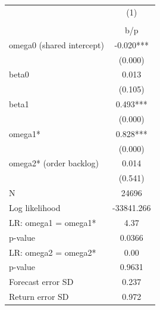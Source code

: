{
\def\sym#1{\ifmmode^{#1}\else\(^{#1}\)\fi}
\begin{tabular}{l*{1}{c}}
\hline\hline
                    &\multicolumn{1}{c}{(1)}\\
                    &\multicolumn{1}{c}{}\\
                    &         b/p   \\
\hline
omega0 (shared intercept)&      -0.020***\\
                    &     (0.000)   \\
beta0               &       0.013   \\
                    &     (0.105)   \\
beta1               &       0.493***\\
                    &     (0.000)   \\
omega1*             &       0.828***\\
                    &     (0.000)   \\
omega2* (order backlog)&       0.014   \\
                    &     (0.541)   \\
\hline
N                   &       24696   \\
Log likelihood      &  -33841.266   \\
LR: omega1 = omega1*&        4.37   \\
p-value             &      0.0366   \\
LR: omega2 = omega2*&        0.00   \\
p-value             &      0.9631   \\
Forecast error SD   &       0.237   \\
Return error SD     &       0.972   \\
\hline\hline
\end{tabular}
}
